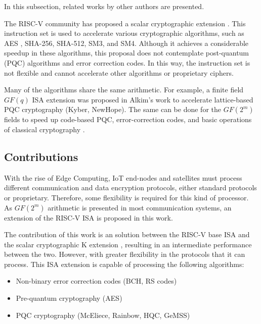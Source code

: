 In this subsection, related works by other authors are presented.

The RISC-V community has proposed a scalar cryptographic extension \cite{zehrisc}. This instruction set 
is used to accelerate various cryptographic algorithms, such as AES \cite{Marshall_Newell_Page_Saarinen_Wolf_2020}, SHA-256, SHA-512, SM3, and SM4. 
Although it achieves a considerable speedup in these algorithms, this proposal does not contemplate 
post-quantum (PQC) algorithms and error correction codes. In this way, the instruction set is not flexible 
and cannot accelerate other algorithms or proprietary ciphers.

Many of the algorithms share the same arithmetic. For example, a finite field $GF(q)$ ISA extension 
was proposed in Alkim's \cite{Alkim_Evkan_Lahr_Niederhagen_Petri_2020} work to accelerate lattice-based PQC 
cryptography (Kyber, NewHope). The same can be done for the $GF(2^m)$ fields to speed up code-based PQC, 
error-correction codes, and basic operations of classical cryptography \cite{10.1145/944645.944659}.

\subsection{Contributions}

With the rise of Edge Computing, IoT end-nodes \cite{8123913} and satellites \cite{8945402} must process different communication and data encryption protocols, 
either standard protocols or proprietary. Therefore, some flexibility is required for this kind of processor.
As $GF(2^m) $ arithmetic is presented in most communication systems, an extension of the RISC-V ISA is proposed in this work. 

The contribution of this work is an solution between the RISC-V base ISA and the scalar cryptographic K extension \cite{zehrisc}, resulting in an 
intermediate performance between the two. However, with greater flexibility in the protocols that it can process. This ISA extension is capable of 
processing the following algorithms:

\begin{itemize}
    \item Non-binary error correction codes (BCH, RS codes)
    \item Pre-quantum cryptography (AES) 
    \item PQC cryptography (McEliece, Rainbow, HQC, GeMSS)
\end{itemize}


